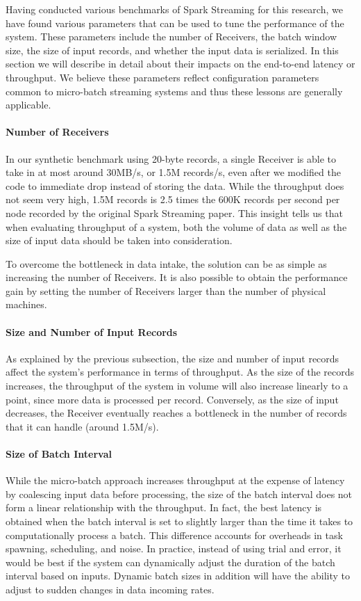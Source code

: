 Having conducted various benchmarks of Spark Streaming for this research, we have found various parameters that can be used to tune the performance of the system. These parameters include the number of Receivers, the batch window size, the size of input records, and whether the input data is serialized. In this section we will describe in detail about their impacts on the end-to-end latency or throughput. We believe these parameters reflect configuration parameters common to micro-batch streaming systems and thus these lessons are generally applicable.

\paragraph{Number of Receivers}
In our synthetic benchmark using 20-byte records, a single Receiver is able to take in at most around 30MB/s, or 1.5M records/s, even after we modified the code to immediate drop instead of storing the data. While the throughput does not seem very high, 1.5M records is 2.5 times the 600K records per second per node recorded by the original Spark Streaming paper. This insight tells us that when evaluating throughput of a system, both the volume of data as well as the size of input data should be taken into consideration.

To overcome the bottleneck in data intake, the solution can be as simple as increasing the number of Receivers. It is also possible to obtain the performance gain by setting the number of Receivers larger than the number of physical machines.

\paragraph{Size and Number of Input Records}
As explained by the previous subsection, the size and number of input records affect the system's performance in terms of throughput. As the size of the records increases, the throughput of the system in volume will also increase linearly to a point, since more data is processed per record. Conversely, as the size of input decreases, the Receiver eventually reaches a bottleneck in the number of records that it can handle (around 1.5M/s).

\paragraph{Size of Batch Interval}
While the micro-batch approach increases throughput at the expense of latency by coalescing input data before processing, the size of the batch interval does not form a linear relationship with the throughput. In fact, the best latency is obtained when the batch interval is set to slightly larger than the time it takes to computationally process a batch. This difference accounts for overheads in task spawning, scheduling, and noise. In practice, instead of using trial and error, it would be best if the system can dynamically adjust the duration of the batch interval based on inputs. Dynamic batch sizes in addition will have the ability to adjust to sudden changes in data incoming rates.

